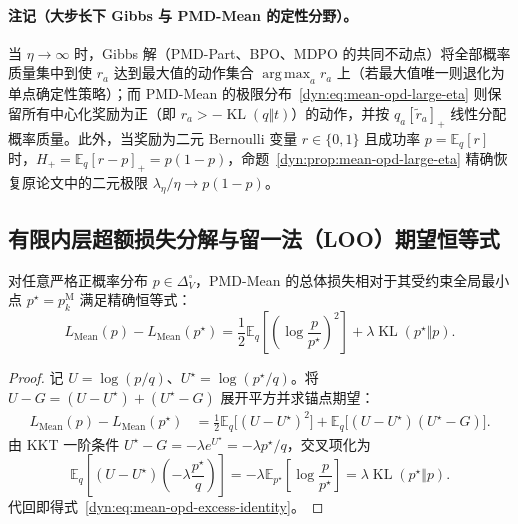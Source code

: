\documentclass[lang=cn,scheme=chinese,openany]{elegantbook}
\newcommand{\E}{\mathbb E}
\newcommand{\KL}{\operatorname{KL}}
\DeclareMathOperator*{\argmax}{arg\,max}
\begin{document}
\paragraph{注记（大步长下 Gibbs 与 PMD-Mean 的定性分野）。}
当 $\eta\to\infty$ 时，Gibbs 解（PMD-Part、BPO、MDPO 的共同不动点）将全部概率质量集中到使 $r_a$ 达到最大值的动作集合 $\argmax_a r_a$ 上（若最大值唯一则退化为单点确定性策略）；而 PMD-Mean 的极限分布~\eqref{dyn:eq:mean-opd-large-eta} 则保留所有中心化奖励为正（即 $r_a>-\KL(q\Vert t)$）的动作，并按 $q_a[\widetilde r_a]_+$ 线性分配概率质量。此外，当奖励为二元 Bernoulli 变量 $r\in\{0,1\}$ 且成功率 $p=\E_q[r]$ 时，$H_+=\E_q[r-p]_+=p(1-p)$，命题~\ref{dyn:prop:mean-opd-large-eta} 精确恢复原论文中的二元极限 $\lambda_\eta/\eta\to p(1-p)$。

\subsection{有限内层超额损失分解与留一法（LOO）期望恒等式}

\begin{proposition}
\label{dyn:prop:mean-opd-excess-identity}
对任意严格正概率分布 $p\in\Delta_V^\circ$，PMD-Mean 的总体损失相对于其受约束全局最小点 $p^\star=p_k^{\mathrm M}$ 满足精确恒等式：
\begin{equation}
 L_{\mathrm{Mean}}(p)-L_{\mathrm{Mean}}(p^\star)
 =\frac12\E_q\left[\left(\log\frac p{p^\star}\right)^2\right]
       +\lambda\KL(p^\star\Vert p).
 \label{dyn:eq:mean-opd-excess-identity}
\end{equation}
\end{proposition}
\begin{proof}
记 $U=\log(p/q)$、$U^\star=\log(p^\star/q)$。将 $U-G=(U-U^\star)+(U^\star-G)$ 展开平方并求锚点期望：
\begin{align*}
 L_{\mathrm{Mean}}(p)-L_{\mathrm{Mean}}(p^\star)
 &=\frac12\E_q\bigl[(U-U^\star)^2\bigr]
   +\E_q\bigl[(U-U^\star)(U^\star-G)\bigr].
\end{align*}
由 KKT 一阶条件 $U^\star-G=-\lambda e^{U^\star}=-\lambda p^\star/q$，交叉项化为
\begin{equation*}
 \E_q\left[(U-U^\star)\left(-\lambda\frac{p^\star}{q}\right)\right]
 =-\lambda\E_{p^\star}\left[\log\frac p{p^\star}\right]
 =\lambda\KL(p^\star\Vert p).
\end{equation*}
代回即得式~\eqref{dyn:eq:mean-opd-excess-identity}。
\end{proof}
\end{document}
